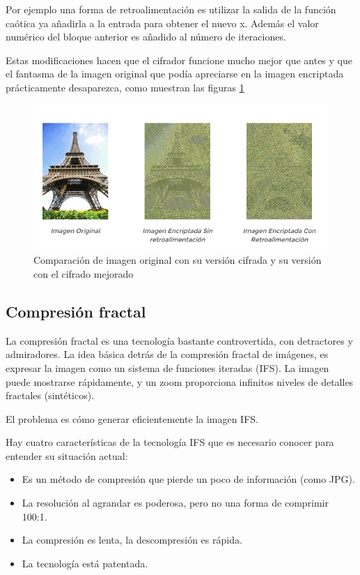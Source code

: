 \begin{example}
Por ejemplo una forma de retroalimentación es utilizar la salida de la función caótica ya añadirla a la entrada para obtener el nuevo x. Además el valor numérico del bloque anterior es añadido al número de iteraciones.

Estas modificaciones hacen que el cifrador funcione mucho mejor que antes y que el fantasma de la imagen original que podía apreciarse en la imagen encriptada prácticamente desaparezca, como muestran las figuras \ref{fig:ImagenCifradaRetro}

\begin{figure}[hbpt]
\centering
\includegraphics[width = \textwidth]{img/imagenCifradaRetro.png}
\caption{Comparación de imagen original con su versión cifrada y su versión con el cifrado mejorado}
\label{fig:ImagenCifradaRetro}
\end{figure}

\subsection{Compresión fractal}\label{sec:compresionFractal}
La compresión fractal es una tecnología bastante controvertida, con detractores y admiradores. La idea básica detrás de la compresión fractal de imágenes, es expresar la imagen como un sistema de funciones iteradas (IFS). La imagen puede mostrarse rápidamente, y un zoom proporciona infinitos niveles de detalles fractales (sintéticos).

El problema es cómo generar eficientemente la imagen IFS.

Hay cuatro características de la tecnología IFS que es necesario conocer para entender su situación actual:
\begin{itemize}
\item Es un método de compresión que pierde un poco de información (como JPG).
\item La resolución al agrandar es poderosa, pero no una forma de comprimir 100:1.
\item La compresión es lenta, la descompresión es rápida.
\item La tecnología está patentada.
\end{itemize}


\end{example}

